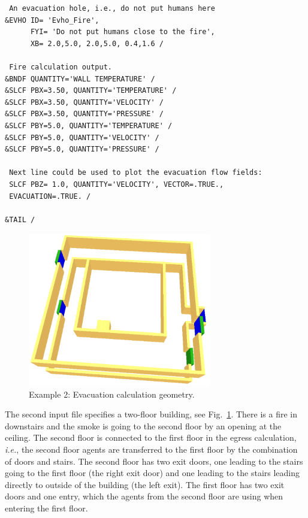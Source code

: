 \documentclass[12pt,a4paper,final,twoside]{stylevk}
\begin{document}
{\begin{verbatim}
 An evacuation hole, i.e., do not put humans here
&EVHO ID= 'Evho_Fire',
      FYI= 'Do not put humans close to the fire',
      XB= 2.0,5.0, 2.0,5.0, 0.4,1.6 /

 Fire calculation output.
&BNDF QUANTITY='WALL TEMPERATURE' / 
&SLCF PBX=3.50, QUANTITY='TEMPERATURE' /
&SLCF PBX=3.50, QUANTITY='VELOCITY' /
&SLCF PBX=3.50, QUANTITY='PRESSURE' /
&SLCF PBY=5.0, QUANTITY='TEMPERATURE' /
&SLCF PBY=5.0, QUANTITY='VELOCITY' /
&SLCF PBY=5.0, QUANTITY='PRESSURE' /

 Next line could be used to plot the evacuation flow fields:
 SLCF PBZ= 1.0, QUANTITY='VELOCITY', VECTOR=.TRUE., 
 EVACUATION=.TRUE. / 

&TAIL /
\end{verbatim}
}


\begin{figure}[!tb]
  \centerline{\includegraphics[clip=true,
    width=80mm]{FIGURES/evac_example2_EvacGeom}}
  \caption{Example 2: Evacuation calculation
    geometry.}\label{Fig_Ex2EvacGeom}
\end{figure}

The second input file specifies a two-floor building, see
Fig.~\ref{Fig_Ex2EvacGeom}.  There is a fire in downstairs and the
smoke is going to the second floor by an opening at the ceiling.  The
second floor is connected to the first floor in the egress
calculation, \emph{i.e.}, the second floor agents are transferred to
the first floor by the combination of doors and stairs.  The second
floor has two exit doors, one leading to the stairs going to the first
floor (the right exit door) and one leading to the stairs leading
directly to outside of the building (the left exit).  The first floor
has two exit doors and one entry, which the agents from the second
floor are using when entering the first floor.
\end{document}
